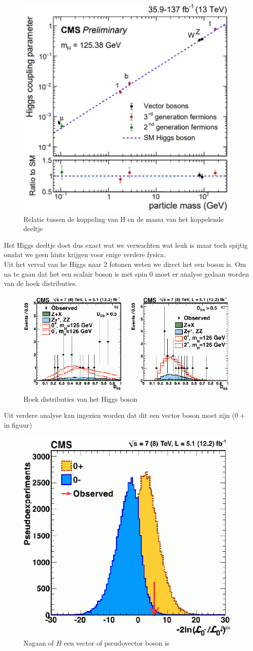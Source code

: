 \documentclass[../main.tex]{subfiles}
\begin{document}
\begin{figure}[h]
    \centering
    \includegraphics[width=0.4\linewidth]{higgs_boson/h_koppeling_massa.png}
    \caption{Relatie tussen de koppeling van H en de massa van het koppelende deeltje}%
    \label{fig:higgs_boson/h_koppeling_massa}
\end{figure}

Het Higgs deeltje doet dus exact wat we verwachten wat leuk is maar toch spijtig omdat we geen hints krijgen voor enige verdere fysica.\\
Uit het verval van he Higgs naar 2 fotonen weten we direct het een boson is. Om na te gaan dat het een scalair boson is met spin 0 moet er analyse gedaan worden van de hoek distributies.

\begin{figure}[h]
    \centering
    \includegraphics[width=0.5\linewidth]{higgs_boson/h_hoek_dist.png}
    \caption{Hoek distributies van het Higgs boson}%
    \label{fig:higgs_boson/h_hoek_dist}
\end{figure}

Uit verdere analyse kan ingezien worden dat dit een vector boson moet zijn ($0+$ in figuur)

\begin{figure}[h]
    \centering
    \includegraphics[width=0.5\linewidth]{higgs_boson/h_vec_boson.png}
    \caption{Nagaan of $H$ een vector of pseudovector boson is}%
    \label{fig:higgs_boson/h_vec_boson}
\end{figure}
\end{document}
